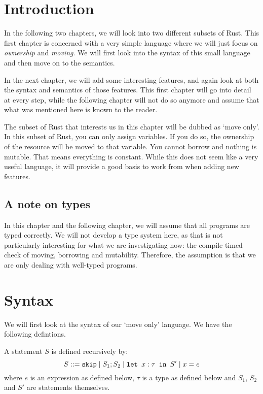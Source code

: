 \section{Introduction}
In the following two chapters, we will look into two different subsets of Rust. This first chapter is concerned with a very simple language where we will just focus on \emph{ownership} and \emph{moving}. We will first look into the syntax of this small language and then move on to the semantics. 

In the next chapter, we will add some interesting features, and again look at both the syntax and semantics of those features. This first chapter will go into detail at every step, while the following chapter will not do so anymore and assume that what was mentioned here is known to the reader.

The subset of Rust that interests us in this chapter will be dubbed as `move only'. In this subset of Rust, you can only assign variables. If you do so, the ownership of the resource will be moved to that variable. You cannot borrow and nothing is mutable. That means everything is constant. While this does not seem like a very useful language, it will provide a good basis to work from when adding new features.

\subsection{A note on types}
In this chapter and the following chapter, we will assume that all programs are typed correctly. We will not develop a type system here, as that is not particularly interesting for what we are investigating now: the compile timed check of moving, borrowing and mutability. Therefore, the assumption is that we are only dealing with well-typed programs. 

\section{Syntax}
We will first look at the syntax of our `move only' language. We have the following defintions.

\begin{definition}
\label{statementsmove}
A statement $S$ is defined recursively by:
$$S ::= \texttt{skip} \mid S_1; S_2 \mid \texttt{let }x : \tau \texttt{ in } S' \mid x = e$$
where $e$ is an expression as defined below, $\tau$ is a type as defined below and $S_1$, $S_2$ and $S'$ are statements themselves.
\end{definition}

